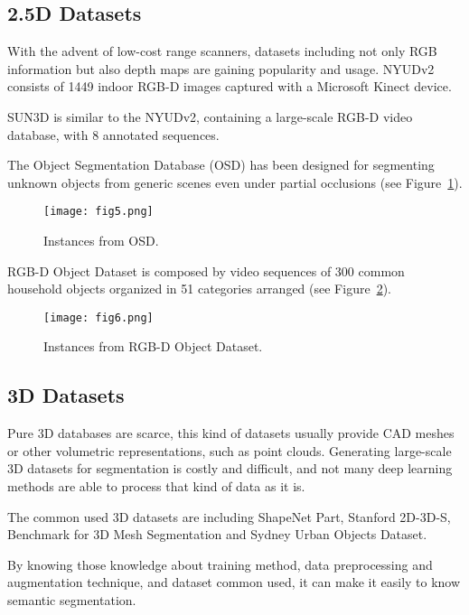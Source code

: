\documentclass[10pt,twocolumn,letterpaper]{article}
\begin{document}
	\subsection*{2.5D Datasets}
	With the advent of low-cost range scanners, datasets including not only RGB information but also depth maps are gaining popularity and usage.
	NYUDv2 consists of 1449 indoor RGB-D images captured with a Microsoft Kinect device.
	\par
	SUN3D is similar to the NYUDv2, containing a large-scale RGB-D video database, with 8 annotated sequences.
	\par
	The Object Segmentation Database (OSD) has been designed for segmenting unknown objects from generic scenes even under partial occlusions (see Figure~\ref{fig5}).
	\begin{figure}[h]
		\centering
		\texttt{[image: fig5.png]}
		\caption{Instances from OSD.} \label{fig5}
	\end{figure}
	\par
	RGB-D Object Dataset is composed by video sequences of 300 common household objects organized in 51 categories arranged (see Figure~\ref{fig6}).
	\begin{figure}[h]
		\centering
		\texttt{[image: fig6.png]}
		\caption{Instances from RGB-D Object Dataset.} \label{fig6}
	\end{figure}
	\subsection*{3D Datasets}
	Pure 3D databases are scarce, this kind of datasets usually provide CAD meshes or other volumetric representations, such as point clouds. Generating large-scale 3D datasets for segmentation is costly and difficult, and not many deep learning methods are able to process that kind of data as it is.
	\par 
	The common used 3D datasets are including ShapeNet Part, Stanford 2D-3D-S, Benchmark for 3D Mesh Segmentation and Sydney Urban Objects Dataset.
	\par
	By knowing those knowledge about training method, data preprocessing and augmentation technique, and dataset common used, it can make it easily to know semantic segmentation.
	{\small
		
		
	}
\end{document}

